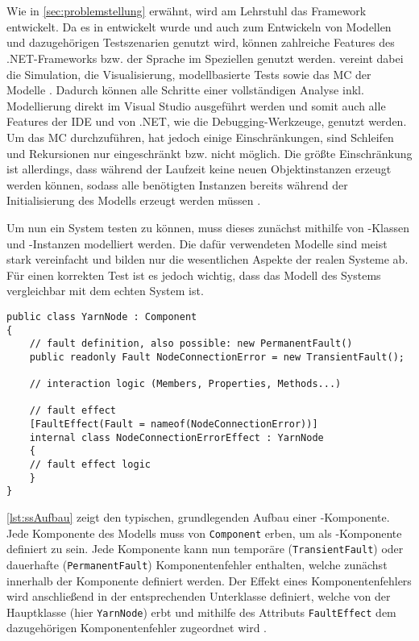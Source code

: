 \section{\sS}\label{sec:sSharp}

Wie in \autoref{sec:problemstellung} erwähnt, wird am Lehrstuhl das Framework \sS entwickelt. Da es in \cS entwickelt wurde und \cS auch zum Entwickeln von Modellen und dazugehörigen Testszenarien genutzt wird, können zahlreiche Features des .NET-Frameworks bzw. der Sprache \cS im Speziellen genutzt werden. \sS vereint dabei die Simulation, die Visualisierung, modellbasierte Tests sowie das MC der Modelle \cite{Habermaier2015,Habermaier2016}. Dadurch können alle Schritte einer vollständigen Analyse inkl. Modellierung direkt im Visual Studio ausgeführt werden und somit auch alle Features der IDE und von .NET, wie \zB die Debugging-Werkzeuge, genutzt werden. Um das MC durchzuführen, hat \sS jedoch einige Einschränkungen, \uA sind Schleifen und Rekursionen nur eingeschränkt bzw. nicht möglich. Die größte Einschränkung ist allerdings, dass während der Laufzeit keine neuen Objektinstanzen erzeugt werden können, sodass alle benötigten Instanzen bereits während der Initialisierung des Modells erzeugt werden müssen \cite{Habermaier2015}.

Um nun ein System testen zu können, muss dieses zunächst mithilfe von \cS-Klassen und -Instanzen modelliert werden. Die dafür verwendeten Modelle sind meist stark vereinfacht und bilden nur die wesentlichen Aspekte der realen Systeme ab. Für einen korrekten Test ist es jedoch wichtig, dass das Modell des Systems vergleichbar mit dem echten System ist.

\begin{minipage}{\linewidth}
\begin{lstlisting}[frame=htrbl, caption={Grundlegender aufbau einer \sS-Komponente}, label={lst:ssAufbau}]
public class YarnNode : Component
{
	// fault definition, also possible: new PermanentFault()
	public readonly Fault NodeConnectionError = new TransientFault();
	
	// interaction logic (Members, Properties, Methods...)
	
	// fault effect
	[FaultEffect(Fault = nameof(NodeConnectionError))]
	internal class NodeConnectionErrorEffect : YarnNode
	{
	// fault effect logic
	}
}
\end{lstlisting}
\end{minipage}

\autoref{lst:ssAufbau} zeigt den typischen, grundlegenden Aufbau einer \sS-Komponente. Jede Komponente des Modells muss von \texttt{Component} erben, um als \sS-Komponente definiert zu sein. Jede Komponente kann nun temporäre (\texttt{TransientFault}) oder dauerhafte (\texttt{PermanentFault}) Komponentenfehler enthalten, welche zunächst innerhalb der Komponente definiert werden. Der Effekt eines Komponentenfehlers wird anschließend in der entsprechenden Unterklasse definiert, welche von der Hauptklasse (hier \texttt{YarnNode}) erbt und mithilfe des Attributs \texttt{FaultEffect} dem dazugehörigen Komponentenfehler zugeordnet wird \cite{Habermaier2016}.

